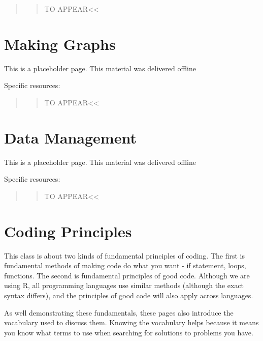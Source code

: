 \documentclass[]{book}
\begin{document}
\begin{quote}
\begin{quote}
TO APPEAR\textless{}\textless{}
\end{quote}
\end{quote}

\chapter{Making Graphs}\label{making-graphs}

This is a placeholder page. This material was delivered offline

Specific resources:

\begin{quote}
\begin{quote}
TO APPEAR\textless{}\textless{}
\end{quote}
\end{quote}

\chapter{Data Management}\label{data-management-1}

This is a placeholder page. This material was delivered offline

Specific resources:

\begin{quote}
\begin{quote}
TO APPEAR\textless{}\textless{}
\end{quote}
\end{quote}

\chapter{Coding Principles}\label{coding-principles}

This class is about two kinds of fundamental principles of coding. The
first is fundamental methods of making code do what you want - if
statement, loops, functions. The second is fundamental principles of
good code. Although we are using R, all programming languages use
similar methods (although the exact syntax differs), and the principles
of good code will also apply across languages.

As well demonstrating these fundamentals, these pages also introduce the
vocabulary used to discuss them. Knowing the vocabulary helps because it
means you know what terms to use when searching for solutions to
problems you have.
\end{document}
